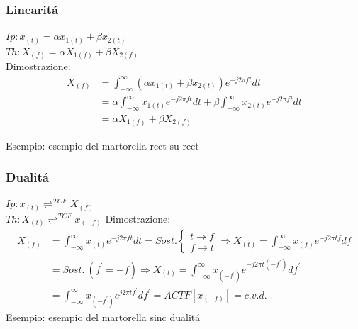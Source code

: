         \subsubsection{Linearitá}\label{Linearita}
            $Ip: x_{(t)} = \alpha x_{1(t)} + \beta x_{2(t)}$\\        
            $Th: X_{(f)} = \alpha X_{1(f)} + \beta X_{2(f)}$\\ 
            Dimostrazione:
            \begin{align}
                X_{(f)} & = \int_{-\infty}^{\infty} (\alpha x_{1(t)} + \beta x_{2(t)}) e^{-j2\pi ft} dt \nonumber \\
                        & = \alpha \int_{-\infty}^{\infty} x_{1(t)} e^{-j2\pi ft} dt + \beta \int_{-\infty}^{\infty}  x_{2(t)} e^{-j2\pi ft} dt  \nonumber \\
                        & = \alpha X_{1(f)} + \beta X_{2(f)} \nonumber
            \end{align}

            Esempio:
                {
                    esempio del martorella rect su rect
                }

        \subsubsection{Dualitá}\label{Dualita}
            $Ip: x_{(t)} \rightleftharpoons^{TCF} X_{(f)}$\\        
            $Th: X_{(t)} \rightleftharpoons^{TCF} x_{(-f)}$ 
            Dimostrazione:
            \begin{align}
                X_{(f)} & = \int_{-\infty}^{\infty} x_{(t)} e^{-j2\pi ft} dt = Sost. \begin{cases}
                    t \rightarrow f\\
                    f \rightarrow t
                \end{cases} \Rightarrow  X_{(t)} = \int_{-\infty}^{\infty} x_{(f)} e^{-j2\pi tf} df \nonumber \\
                        & =Sost.\ (f^\prime = -f) \Rightarrow  X_{(t)} = \int_{-\infty}^{\infty} x_{(-f^\prime)} e^{-j2\pi t(-f^\prime)} df^\prime\nonumber \\
                        & =\int_{-\infty}^{\infty} x_{(-f^\prime)} e^{j2\pi tf^\prime} df^\prime= ACTF[x_{(-f)}] = c.v.d.  \nonumber
            \end{align}
            Esempio:
                {
                    esempio del martorella sinc dualitá
                }

